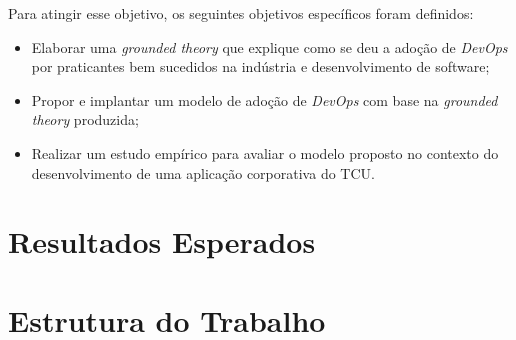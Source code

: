 Para atingir esse objetivo, os seguintes objetivos específicos foram definidos:

\begin{itemize}
\item Elaborar uma \textit{grounded theory} que explique como se deu a adoção
de \textit{DevOps} por praticantes bem sucedidos na indústria e desenvolvimento
de software;
\item Propor e implantar um modelo de adoção de \textit{DevOps} com base na
\textit{grounded theory} produzida;
\item Realizar um estudo empírico para avaliar o modelo proposto no contexto
do desenvolvimento de uma aplicação corporativa do \acrshort{TCU}.
\end{itemize}

\section{Resultados Esperados}

\section{Estrutura do Trabalho}


